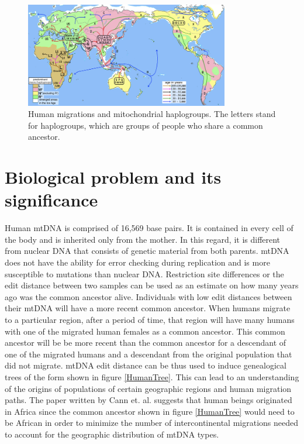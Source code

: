 \documentclass[conference]{IEEEtran}
\begin{document}
\begin{figure}[!t]
\centering
\includegraphics[width=3.5in]{./figures/Human_migrations_and_mitochondrial_haplogroups.png}
\caption{Human migrations and mitochondrial haplogroups. The letters stand for haplogroups, which are groups of people who share a common ancestor.}
\label{HumanMigration}
\end{figure}




%
\IEEEpeerreviewmaketitle

\section{Biological problem and its significance}
Human mtDNA is comprised of 16,569 base pairs. It is contained in every cell of the body and is inherited only from the mother. In this regard, it is different from nuclear DNA that consists of genetic material from both parents. mtDNA does not have the ability for error checking during replication and is more susceptible to mutations than nuclear DNA. Restriction site differences or the edit distance between two samples can be used as an estimate on how many years ago was the common ancestor alive. Individuals with low edit distances between their mtDNA will have a more recent common ancestor. When humans migrate to a particular region, after a period of time, that region will have many humans with one of the migrated human females as a common ancestor. This common ancestor will be be more recent than the common ancestor for a descendant of one of the migrated humans and a descendant from the original population that did not migrate. mtDNA edit distance can be thus used to induce genealogical trees of the form shown in figure \ref{HumanTree}. This can lead to an understanding of the origins of populations of certain geographic regions and human migration paths. The paper written by Cann et. al. suggests that human beings originated in Africa since the common ancestor shown in figure \ref{HumanTree} would need to be African in order to minimize the number of intercontinental migrations needed to account for the geographic distribution of mtDNA types.
\end{document}
